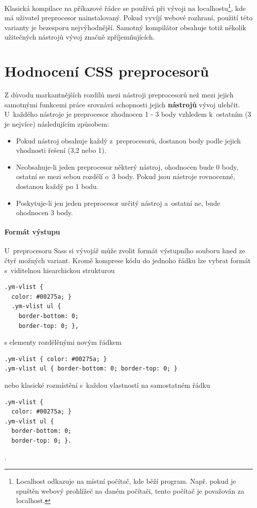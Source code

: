 \documentclass[thesis=B,czech]{FITthesis}[2012/06/26]
\begin{document}
Klasická kompilace na příkazové řádce se používá při vývoji na localhostu\footnote{Localhost odkazuje na místní počítač, kde běží program. Např. pokud je spuštěn webový prohlížeč na daném počítači, tento počítač je považován za localhost.}, kde má uživatel preprocesor nainstalovaný. Pokud vyvíjí webové rozhraní, použití této varianty je bezesporu nejvýhodnější. Samotný kompilátor obsahuje totiž několik užitečných nástrojů vývoj značně zpříjemňujících. 

\section{Hodnocení CSS preprocesorů}
Z důvodu markantnějších rozdílů mezi nástroji preprocesorů než mezi jejich samotnými funkcemi práce srovnává schopnosti jejich \textbf{nástrojů} vývoj ulehčit. U~každého nástroje je preprocesor zhodnocen 1 - 3 body vzhledem k~ostatním (3 je nejvíce) následujícím způsobem:

\begin{itemize}
 \item Pokud nástroj obsahuje každý z~preprocesorů, dostanou body podle jejich vhodnosti řešení (3,2 nebo 1). 
 \item Neobsahuje-li jeden preprocesor některý nástroj, ohodnocen bude 0 body, ostatní se mezi sebou rozdělí o~3 body. Pokud jsou nástroje rovnocenné, dostanou každý po 1 bodu.
 \item Poskytuje-li jen jeden preprocesor určitý nástroj a~ostatní ne, bude ohodnocen 3 body. 
\end{itemize}

\paragraph{Formát výstupu}

 U~preprocesoru \gls{Sass} si vývojář může zvolit formát výstupního souboru hned ze čtyř možných variant. Kromě komprese kódu do jednoho řádku lze vybrat formát s~viditelnou hiearchickou strukturou
\scriptsize
\begin{verbatim}
.ym-vlist {
  color: #00275a; }
  .ym-vlist ul {
    border-bottom: 0;
    border-top: 0; },
\end{verbatim}
\normalsize
s elementy rozdělěnými novým řádkem 
\scriptsize
\begin{verbatim}
.ym-vlist { color: #00275a; }
.ym-vlist ul { border-bottom: 0; border-top: 0; }
\end{verbatim}
\normalsize
nebo klasické rozmístění s~každou vlastností na samostatném řádku
\scriptsize
\begin{verbatim}
.ym-vlist {
  color: #00275a; }
.ym-vlist ul {
  border-bottom: 0;
  border-top: 0; }.
\end{verbatim}
\normalsize.
\end{document}
